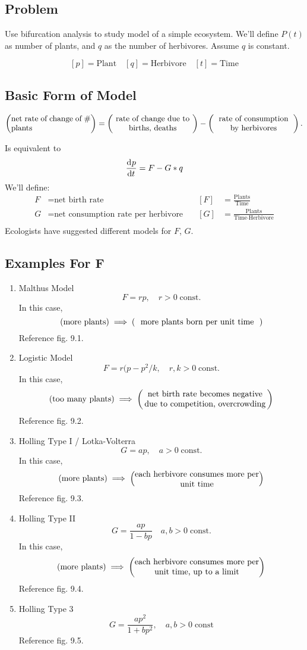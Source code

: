 \documentclass[12pt,twoside]{article}
\begin{document}
\subsection{Problem}
Use bifurcation analysis to study model of a simple ecosystem.
We'll define $P(t)$ as  number of plants, and $q$ as the number of herbivores.
Assume $q$ is constant.

$$[p]=\text{Plant}\quad[q]=\text{Herbivore}\quad[t]=\text{Time}$$

\subsection{Basic Form of Model}
\begin{equation}
  \left( \text{\parbox{10em}{net rate of change of \# plants}} \right) = \left( \text{\parbox{10em}{\centering rate of change due to births, deaths}} \right) - \left( \text{\parbox{10em}{\centering rate of consumption by herbivores}} \right).
\end{equation}

Is equivalent to $$\frac{\mathrm{d}^{} {p}}{\mathrm{d}{t}^{}}=F-G*q$$
We'll define:
\begin{equation}
  \begin{aligned}
    F &= \text{net birth rate} &\quad [F] &= \frac{\text{Plants}}{\text{Time}} \\
    G &=  \text{net consumption rate per herbivore} &\quad [G]&= \frac{\text{Plants}}{\text{Time} \cdot \text{Herbivore}} \\
  \end{aligned}
\end{equation}
Ecologists have suggested different models for $F$, $G$.

\subsection{Examples For F}
\begin{enumerate}
\item Malthus Model
$$F = rp, \quad r>0\;\text{const}.$$
In this case,
$$\left(\text{more plants}\right) \implies \left(\text{\parbox{15em}{\centering more plants
    born per unit time}}\right)$$
Reference fig. 9.1.
\item Logistic Model
$$F= r(p-p^2/k, \quad r,k>0\;\text{const}.$$
In this case,
$$\left(\text{too many plants}\right) \implies
\left(\text{\parbox{15em}{\centering net birth rate becomes negative due to
      competition, overcrowding}}\right)$$
Reference fig. 9.2.
\item Holling Type I / Lotka-Volterra
$$G = ap,\quad a>0\;\text{const}.$$
In this case,
$$\left(\text{more plants}\right) \implies \left(\text{\parbox{15em}{\centering
      each herbivore consumes more per unit time}}\right)$$
Reference fig. 9.3.
\item Holling Type II
$$G = \frac{ap}{1-bp}\quad a,b>0\;\text{const}.$$
In this case,
$$\left(\text{more plants}\right) \implies \left(\text{\parbox{15em}{\centering
      each herbivore consumes more per unit time, up to a limit}}\right)$$
Reference fig. 9.4.
\item Holling Type 3
$$G=\frac{ap^2}{1+bp^2},\quad a,b>0\;\text{const}$$
Reference fig. 9.5.
\end{enumerate}
\end{document}
